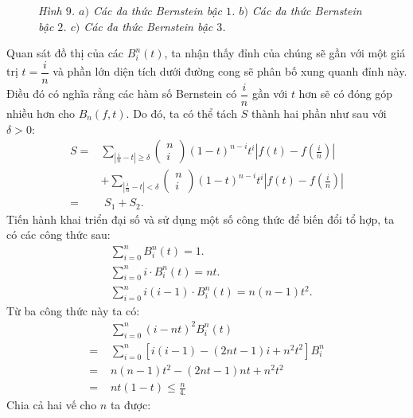 \begin{multicols}{2}
\begin{figure}[H]
			\caption{\small\textit{\color{toanhocdoisong}Hình $9$. $a)$ Các đa thức Bernstein bậc $1$. $b)$ Các đa thức Bernstein bậc $2$. $c)$ Các đa thức Bernstein bậc $3$.}}
			\vspace*{-5pt}
		\end{figure}
		Quan sát đồ thị của các $B_i^n (t)$, ta nhận thấy đỉnh của chúng sẽ gần với một giá trị $t= \dfrac{i}{n}$ và phần lớn diện tích dưới đường cong sẽ phân bố xung quanh đỉnh này. Điều đó có nghĩa rằng các hàm số Bernstein có $\dfrac{i}{n}$ gần với $t$ hơn sẽ có đóng góp nhiều hơn cho $B_n (f,t)$. Do đó, ta có thể tách $S$ thành hai phần như sau với $ \delta >0$:
		\begin{align*}
			S =& \sum\limits_{\left| {\frac{i}{n} - t} \right| \ge \delta }\!\!\! \left(\!\!\!\! \begin{array}{l}
				n\\
				i
			\end{array}\!\!\!\! \right){{(1 \!-\! t)}^{n - i}}{t^i}\left| {f(t) - f\left( {\frac{i}{n}} \right)} \right| \\
			&+ \!\! \sum\limits_{\left| {\frac{i}{n} - t} \right| < \delta }\!\!\! \left(\!\!\!\! \begin{array}{l}
				n\\
				i
			\end{array}\!\!\!\! \right){{(1 \!-\! t)}^{n - i}}{t^i}\left| {f(t) \!-\! f\left(\! {\frac{i}{n}} \!\right)} \right|\\
			=&\,\, S_1 + S_2.
		\end{align*}
		Tiến hành khai triển đại số và sử dụng một số công thức để biến đổi tổ hợp, ta có các công thức sau:
		\begin{align*}
			&\sum\limits_{i = 0}^n {B_i^n(t) = 1}.\\
			&\sum\limits_{i = 0}^n {i \cdot B_i^n(t) = nt.}\\
			&\sum\limits_{i = 0}^n {i(i - 1) \cdot B_i^n(t) = n(n - 1){t^2}.}
		\end{align*}
		Từ ba công thức này ta có:
		\begin{align*}
			&\sum\limits_{i = 0}^n {{{(i - nt)}^2}B_i^n(t)} \\
			=\,\, &\sum\limits_{i = 0}^n \left[ {i(i - 1) - (2nt - 1)i + {n^2}{t^2}} \right]B_i^n \\
			= \,\,&n(n - 1){t^2} - (2nt - 1)nt + {n^2}{t^2} \\
			= \,\,&nt(1 - t) \le \frac{n}{{4.}}
		\end{align*}
		Chia cả hai vế cho $n$ ta được:
		\begin{align*}

\end{align*}
\end{multicols}
